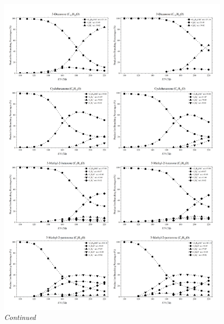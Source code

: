 \begin{figure}\ContinuedFloat
\centering
\includegraphics[width=1\textwidth]{pics/ketones/plot_5.png}
\caption{\textit{Continued}}
\end{figure}
